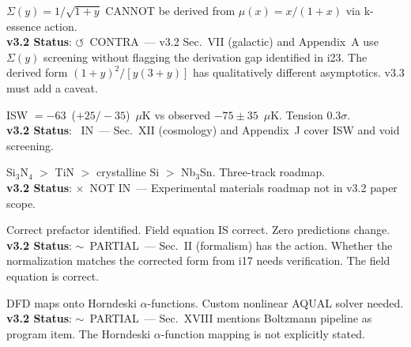 \documentclass[11pt,a4paper]{article}
\newcommand{\vin}{\textcolor{statusIN}{\checkmark~IN}}
\newcommand{\vpartial}{\textcolor{statusPARTIAL}{$\sim$~PARTIAL}}
\newcommand{\vnot}{\textcolor{statusNOT}{$\times$~NOT IN}}
\newcommand{\vcontra}{\textcolor{statusCONTRA}{$\circlearrowleft$~CONTRA}}
\begin{document}
\begin{tcolorbox}[colback=technical!5,colframe=technical,title=\textbf{F60: Screening Function Gap (Open)}]
$\Sigma(y) = 1/\sqrt{1+y}$ CANNOT be derived from $\mu(x) = x/(1+x)$ via k-essence action.\\
\textbf{v3.2 Status}: \vcontra\ --- v3.2 Sec.~VII (galactic) and Appendix~A use $\Sigma(y)$ screening without flagging the derivation gap identified in i23. The derived form $(1+y)^2/[y(3+y)]$ has qualitatively different asymptotics. v3.3 must add a caveat.
\end{tcolorbox}

\begin{tcolorbox}[colback=technical!5,colframe=technical,title=\textbf{F61: T4 Cold Spot Resolution via Environmental Screening}]
ISW $= -63$~($+25/-35$)~$\mu$K vs observed $-75 \pm 35$~$\mu$K. Tension 0.3$\sigma$.\\
\textbf{v3.2 Status}: \vin\ --- Sec.~XII (cosmology) and Appendix~J cover ISW and void screening.
\end{tcolorbox}

\begin{tcolorbox}[colback=technical!5,colframe=technical,title=\textbf{F62: Materials Roadmap Converged}]
Si$_3$N$_4$ $>$ TiN $>$ crystalline Si $>$ Nb$_3$Sn. Three-track roadmap.\\
\textbf{v3.2 Status}: \vnot\ --- Experimental materials roadmap not in v3.2 paper scope.
\end{tcolorbox}

\begin{tcolorbox}[colback=technical!5,colframe=technical,title=\textbf{F63: Action Eq.(6) Normalization --- Presentation Error Only}]
Correct prefactor identified. Field equation IS correct. Zero predictions change.\\
\textbf{v3.2 Status}: \vpartial\ --- Sec.~II (formalism) has the action. Whether the normalization matches the corrected form from i17 needs verification. The field equation is correct.
\end{tcolorbox}

\begin{tcolorbox}[colback=technical!5,colframe=technical,title=\textbf{F64: mochi\_class / SymBoltz.jl Architecture for DFD}]
DFD maps onto Horndeski $\alpha$-functions. Custom nonlinear AQUAL solver needed.\\
\textbf{v3.2 Status}: \vpartial\ --- Sec.~XVIII mentions Boltzmann pipeline as program item. The Horndeski $\alpha$-function mapping is not explicitly stated.
\end{tcolorbox}
\end{document}
